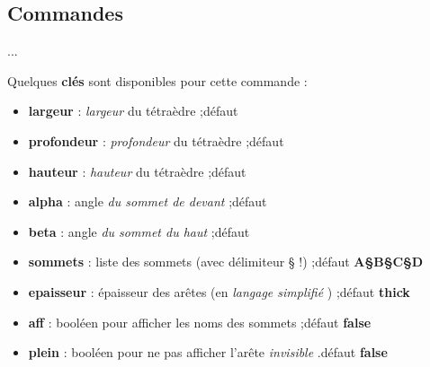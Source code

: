 \documentclass{article}
\newcommand\Cle[1]{{\bfseries\sffamily\textlangle #1\textrangle}}
\begin{document}
\subsection{Commandes}

\begin{codetex}
...
\end{codetex}

\begin{codecles}
Quelques \Cle{clés} sont disponibles pour cette commande :

\begin{itemize}
	\item \Cle{largeur} : \textit{largeur} du tétraèdre ;\hfill{}défaut \Cle{4}
	\item \Cle{profondeur} : \textit{profondeur} du tétraèdre ;\hfill{}défaut \Cle{1.25}
	\item \Cle{hauteur} : \textit{hauteur} du tétraèdre ;\hfill{}défaut \Cle{3}
	\item \Cle{alpha} : angle \textit{du sommet de devant} ;\hfill{}défaut \Cle{40}
	\item \Cle{beta} : angle \textit{du sommet du haut} ;\hfill{}défaut \Cle{60}
	\item \Cle{sommets} : liste des sommets (avec délimiteur § !) ;\hfill{}défaut \Cle{A§B§C§D}
	\item \Cle{epaisseur} : épaisseur des arêtes (en \textit{langage simplifié} \TikZ) ;\hfill{}défaut \Cle{thick}
	\item \Cle{aff} : booléen pour afficher les noms des sommets ;\hfill{}défaut \Cle{false}
	\item \Cle{plein} : booléen pour ne pas afficher l'arête \textit{invisible} .\hfill{}défaut \Cle{false}
\end{itemize}
\end{codecles}

\begin{codetex}
\tetraPL
\end{codetex}

\begin{codetex}
\tetraPL[aff,largeur=2,profondeur=0.625,hauteur=1.5]
\end{codetex}

\begin{codetex}
\tetraPL[plein,aff,largeur=5,beta=60]
\end{codetex}
\end{document}
